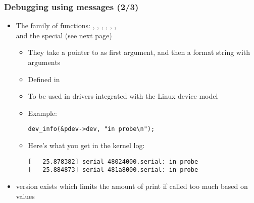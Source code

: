 \begin{frame}[fragile]
  \frametitle{Debugging using messages (2/3)}
  \begin{itemize}
  \item The  family of functions: ,
    , , ,
    , ,  \\
    and the special  (see next page)
    \begin{itemize}
    \item They take a pointer to  as first
      argument, and then a format string with arguments
    \item Defined in 
    \item To be used in drivers integrated with the Linux device
      model
    \item Example:
      \begin{verbatim}
dev_info(&pdev->dev, "in probe\n");
      \end{verbatim}
    \item Here's what you get in the kernel log:
      \begin{verbatim}
[   25.878382] serial 48024000.serial: in probe
[   25.884873] serial 481a8000.serial: in probe
      \end{verbatim}
    \end{itemize}
  \item {} version exists which limits the amount of print
    if called too much based on 
    values
  \end{itemize}
\end{frame}

